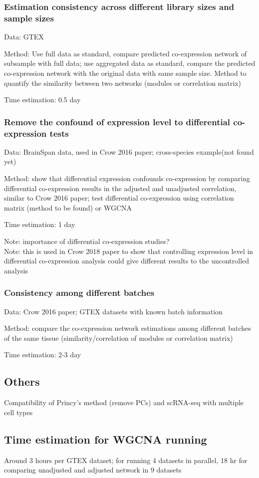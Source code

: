 \documentclass[english,letterpaper,pdftex,12pt]{article}
\begin{document}
\subsubsection*{Estimation consistency across different library sizes and sample sizes}

Data: GTEX

Method: Use full data as standard, compare predicted co-expression network of subsample with full data; use aggregated data as standard, compare the predicted co-expression network with the original data with same sample size. Method to quantify the similarity between two networks (modules or correlation matrix)

Time estimation: 0.5 day

\subsubsection*{Remove the confound of expression level to differential co-expression tests}

Data: BrainSpan data, used in Crow 2016 paper; cross-species example(not found yet)

Method: show that differential expression confounds co-expression by comparing differential co-expression results in the adjusted and unadjusted correlation, similar to Crow 2016 paper;
test differential co-expression using correlation matrix (method to be found) or WGCNA

Time estimation: 1 day

Note: importance of differential co-expression studies?\\
Note: this is used in Crow 2018 paper to show that controlling expression level in differential co-expression analysis could give different results to the uncontrolled analysis

\subsubsection*{Consistency among different batches }

Data: Crow 2016 paper; GTEX datasets with known batch information

Method: compare the co-expression network estimations among different batches of the same tissue (similarity/correlation of modules or correlation matrix)

Time estimation: 2-3 day

\subsection*{Others}
Compatibility of Princy's method (remove PCs) and scRNA-seq with multiple cell types

\subsection*{Time estimation for WGCNA running}
Around 3 hours per GTEX dataset; for running 4 datasets in parallel, 18 hr for comparing unadjusted and adjusted network in 9 datasets 
\end{document}
